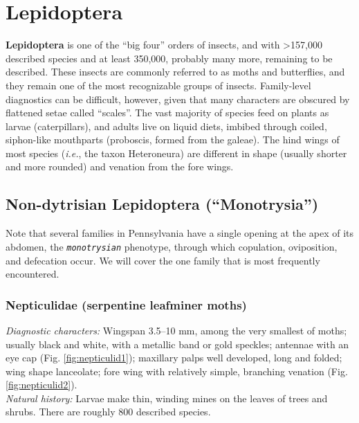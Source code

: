 \documentclass[letterpaper, 11pt]{article}
\newcommand{\latinword}[1]{\texttt{\itshape #1}}%
\begin{document}
\section{Lepidoptera}

\noindent{}\textbf{Lepidoptera} is one of the ``big four'' orders of insects, and with \textgreater157,000 described species and at least 350,000, probably many more, remaining to be described. These insects are commonly referred to as moths and butterflies, and they remain one of the most recognizable groups of insects. Family-level diagnostics can be difficult, however, given that many characters are obscured by flattened setae called ``scales''. The vast majority of species feed on plants as larvae (caterpillars), and adults live on liquid diets, imbibed through coiled, siphon-like mouthparts (proboscis, formed from the galeae). The hind wings of most species (\textit{i.e.}, the taxon Heteroneura) are different in shape (usually shorter and more rounded) and venation from the fore wings.

\subsection{Non-dytrisian Lepidoptera (``Monotrysia'')}
Note that several families in Pennsylvania have a single opening at the apex of its abdomen, the \latinword{monotrysian} phenotype, through which copulation, oviposition, and defecation occur. We will cover the one family that is most frequently encountered.

\subsubsection{Nepticulidae (serpentine leafminer moths)}
\noindent{}\textit{Diagnostic characters:} Wingspan 3.5--10 mm, among the very smallest of moths; usually black and white, with a metallic band or gold speckles; antennae with an eye cap (Fig. \ref{fig:nepticulid1}); maxillary palps well developed, long and folded; wing shape lanceolate; fore wing with relatively simple, branching venation (Fig. \ref{fig:nepticulid2}).\\

\noindent{}\textit{Natural history:} Larvae make thin, winding mines on the leaves of trees and shrubs. There are roughly 800 described species.
\end{document}
